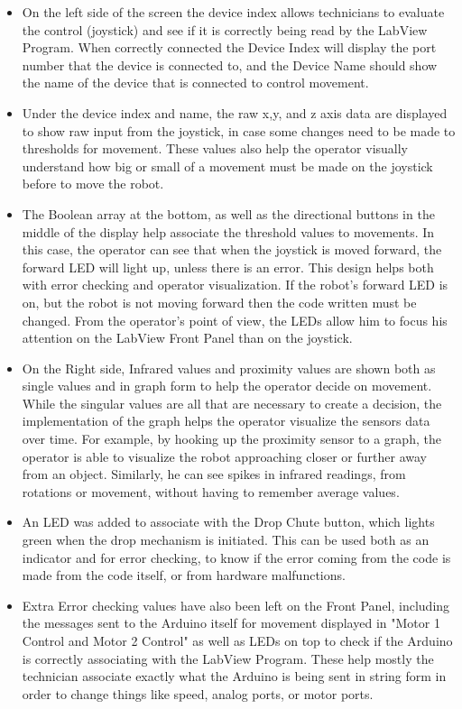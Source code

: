 \documentclass{article}
\begin{document}
\begin{itemize}
    \item On the left side of the screen the device index allows technicians to evaluate the control (joystick) and see if it is correctly being read by the LabView Program. When correctly connected the Device Index will display the port number that the device is connected to, and the Device Name should show the name of the device that is connected to control movement.
    \item Under the device index and name, the raw x,y, and z axis data are displayed to show raw input from the joystick, in case some changes need to be made to thresholds for movement. These values also help the operator visually understand how big or small of a movement must be made on the joystick before to move the robot.
    \item The Boolean array at the bottom, as well as the directional buttons in the middle of the display help associate the threshold values to movements. In this case, the operator can see that when the joystick is moved forward, the forward LED will light up, unless there is an error. This design helps both with error checking and operator visualization. If the robot's forward LED is on, but the robot is not moving forward then the code written must be changed. From the operator's point of view, the LEDs allow him to focus his attention on the LabView Front Panel than on the joystick.
    \item On the Right side, Infrared values and proximity values are shown both as single values and in graph form to help the operator decide on movement. While the singular values are all that are necessary to create a decision, the implementation of the graph helps the operator visualize the sensors data over time. For example, by hooking up the proximity sensor to a graph, the operator is able to visualize the robot approaching closer or further away from an object. Similarly, he can see spikes in infrared readings, from rotations or movement, without having to remember average values.
    \item An LED was added to associate with the Drop Chute button, which lights green when the drop mechanism is initiated. This can be used both as an indicator and for error checking, to know if the error coming from the code is made from the code itself, or from hardware malfunctions.
    \item Extra Error checking values have also been left on the Front Panel, including the messages sent to the Arduino itself for movement displayed in "Motor 1 Control and Motor 2 Control" as well as LEDs on top to check if the Arduino is correctly associating with the LabView Program. These help mostly the technician associate exactly what the Arduino is being sent in string form in order to change things like speed, analog ports, or motor ports.
\end{itemize}
\end{document}
